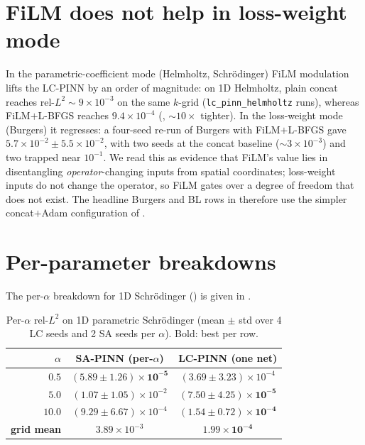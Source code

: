 \section{FiLM does not help in loss-weight mode}
\label{sec:appendix-film-loss-weight}

In the parametric-coefficient mode (Helmholtz, Schrödinger) FiLM
modulation lifts the LC-PINN by an order of magnitude: on 1D
Helmholtz, plain concat reaches rel-$L^2 \!\sim\!9\!\times\!10^{-3}$
on the same $k$-grid (\texttt{lc\_pinn\_helmholtz} runs), whereas
FiLM$+$L-BFGS reaches $9.4\!\times\!10^{-4}$ (,
$\sim\!10\times$ tighter). In the loss-weight mode (Burgers) it
regresses: a four-seed re-run of Burgers with
FiLM$+$L-BFGS gave $5.7\!\times\!10^{-2} \pm 5.5\!\times\!10^{-2}$,
with two seeds at the concat baseline ($\sim\!3\!\times\!10^{-3}$)
and two trapped near $10^{-1}$. We read this as evidence that
FiLM's value lies in disentangling \emph{operator}-changing inputs
from spatial coordinates; loss-weight inputs do not change the
operator, so FiLM gates over a degree of freedom that does not
exist. The headline Burgers and BL rows in
 therefore use the simpler
concat$+$Adam configuration of \citet{dosovitskiy2020}.

\section{Per-parameter breakdowns}
\label{sec:appendix-per-param}

The per-$\alpha$ breakdown for 1D Schrödinger
() is given in
.

\begin{table}[h]
\centering
\caption{Per-$\alpha$ rel-$L^2$ on 1D parametric Schrödinger
(mean $\pm$ std over 4 LC seeds and 2 SA seeds per $\alpha$).
Bold: best per row.}
\label{tab:schrod-per-alpha}
\small
\begin{tabular}{r|cc}
\toprule
$\alpha$ & SA-PINN (per-$\alpha$) & LC-PINN (one net) \\
\midrule
$0.5$  & $\mathbf{(5.89\!\pm\!1.26)\!\times\!10^{-5}}$ & $(3.69\!\pm\!3.23)\!\times\!10^{-4}$ \\
$5.0$  & $(1.07\!\pm\!1.05)\!\times\!10^{-2}$ & $\mathbf{(7.50\!\pm\!4.25)\!\times\!10^{-5}}$ \\
$10.0$ & $(9.29\!\pm\!6.67)\!\times\!10^{-4}$ & $\mathbf{(1.54\!\pm\!0.72)\!\times\!10^{-4}}$ \\
\midrule
\textbf{grid mean} & $3.89\!\times\!10^{-3}$ & $\mathbf{1.99\!\times\!10^{-4}}$ \\
\bottomrule
\end{tabular}
\end{table}

